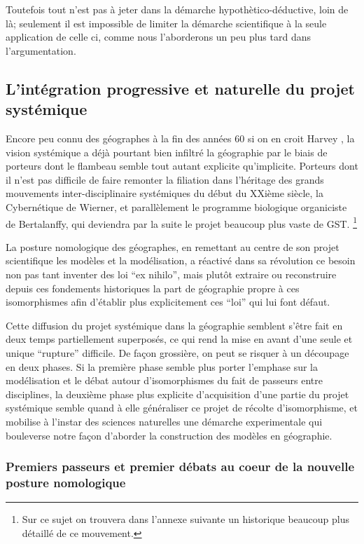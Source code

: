 {Toutefois tout n'est pas à jeter dans la démarche hypothètico-déductive, loin de là; seulement il est impossible de limiter la démarche scientifique à la seule application de celle ci, comme nous l'aborderons un peu plus tard dans l'argumentation.

\subsection{L'intégration progressive et naturelle du projet systémique} 

Encore peu connu des géographes à la fin des années 60 si on en croit Harvey \autocite{Harvey1969}, la vision systémique a déjà pourtant bien infiltré la géographie par le biais de porteurs dont le flambeau semble tout autant explicite qu'implicite. Porteurs dont il n'est pas difficile de faire remonter la filiation dans l'héritage des grands mouvements inter-disciplinaire systémiques du début du XXième siècle, la Cybernétique de Wierner, et parallèlement le programme biologique organiciste de Bertalanffy, qui deviendra par la suite le projet beaucoup plus vaste de GST. \footnote{Sur ce sujet on trouvera dans l'annexe suivante un historique beaucoup plus détaillé de ce mouvement.}

La posture nomologique des géographes, en remettant au centre de son projet scientifique les modèles et la modélisation, a réactivé dans sa révolution ce besoin non pas tant inventer des loi \foreignquote{latin}{ex nihilo}, mais plutôt extraire ou reconstruire depuis ces fondements historiques la part de géographie propre à ces isomorphismes afin d'établir plus explicitement ces \enquote{loi} qui lui font défaut.

Cette diffusion du projet systémique dans la géographie semblent s'être fait en deux temps partiellement superposés, ce qui rend la mise en avant d'une seule et unique \enquote{rupture} difficile. De façon grossière, on peut se risquer à un découpage en deux phases. Si la première phase semble plus porter l'emphase sur la modélisation et le débat autour d'isomorphismes du fait de passeurs entre disciplines, la deuxième phase plus explicite d'acquisition d'une partie du projet systémique semble quand à elle généraliser ce projet de récolte d'isomorphisme, et mobilise à l'instar des sciences naturelles une démarche experimentale qui bouleverse notre façon d'aborder la construction des modèles en géographie. 

\subsubsection{Premiers passeurs et premier débats au coeur de la nouvelle posture nomologique}

}
